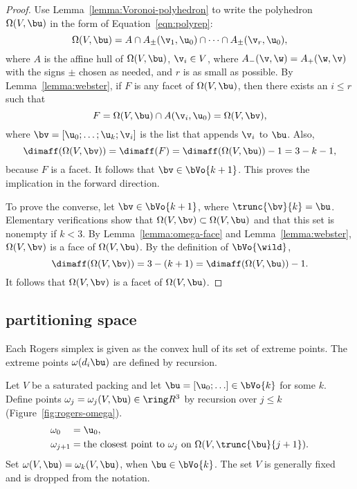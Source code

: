 \begin{cnl}
\begin{proof} 
  Use Lemma~\ref{lemma:Voronoi-polyhedron} to write the polyhedron $\Omega(V,\bu)$ in
  the form of Equation~\ref{eqn:polyrep}:
\[  
\Omega(V,\bu) = A \cap A_\pm(\v_1,\u_0) \cap \cdots\cap A_\pm(\v_r,\u_0),
\] 
where $A$ is the affine hull of $\Omega(V,\bu)$, $\v_i\in V$, where
$\Aminus(\v,\w) = \Aplus(\w,\v)$ with the signs $\pm$ chosen as needed, and
$r$ is as small as possible.  By Lemma~\ref{lemma:webster}, if $F$ is
any facet of $\Omega(V,\bu)$, then there exists an $i\le r$ such that
\[  
F = \Omega(V,\bu) \cap \AA{\v_i}{\u_0} = \Omega(V,\bv),
\] 
where $\bv = [\u_0;\ldots;\u_k;\v_i]$ is the list that appends $\v_i$
to $\bu$.  Also,
\[  
\dimaff(\Omega(V,\bv)) = \dimaff(F) = \dimaff(\Omega(V,\bu)) - 1 = 3 - k - 1,
\] 
because $F$ is a facet.  It follows that $\bv \in \bVo{k+1}$.  This
proves the implication in the forward direction.

To prove the converse, let $\bv\in \bVo{k+1}$, where $\trunc{\bv}{k} =
\bu$.  Elementary verifications show that $\Omega(V,\bv)\subset
\Omega(V,\bu)$ and that this set is nonempty if $k<3$.  By
Lemma~\ref{lemma:omega-face} and Lemma~\ref{lemma:webster},
$\Omega(V,\bv)$ is a face of $\Omega(V,\bu)$.  By the definition of
$\bVo{\wild }$,
\[  
\dimaff(\Omega(V,\bv)) = 3 - (k+1) = \dimaff(\Omega(V,\bu)) -1.
\] 
It follows that $\Omega(V,\bv)$ is a facet of $\Omega(V,\bu)$.
\end{proof}


\subsection{partitioning space}\label{partitioning space}

Each Rogers simplex is given as the convex hull of  its set of extreme points.  
The extreme points $\omega(d_i\bu)$
are defined by recursion.

\begin{definition}[$\omega$]
\label{def:omega}
%
Let $V$ be a saturated packing and let $\bu=[\u_0;\ldots]\in \bVo{k}$
for some $k$.  Define points $\omega_j=\omega_j(V,\bu)\in\vecR{3}$ by
recursion over $j\le k$ (Figure~\ref{fig:rogers-omega}).
\begin{align*}
\omega_{0\phantom{+1}} &= \u_0,\\
\omega_{j+1} &=\text{the closest point to } \omega_j 
\text{ on }\Omega(V,\trunc{\bu}{j+1}).
\end{align*}
Set $\omega(V,\bu) = \omega_{k}(V,\bu)$, when $\bu\in \bVo{k}$.  The
set $V$ is generally fixed and is dropped from the notation.
\end{definition}


\end{cnl}
